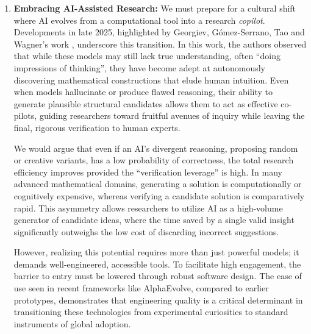 \documentclass[11pt]{article}
\numberwithin{equation}{section}
\begin{document}
\begin{enumerate}
    \item \textbf{Embracing AI-Assisted Research:} We must prepare for a cultural shift where AI evolves from a computational tool into a research \textit{copilot}. Developments in late 2025, highlighted by Georgiev, G{\'o}mez-Serrano, Tao and Wagner's work \cite{georgiev2025mathematical}, underscore this transition. In this work, the authors observed that while these models may still lack true understanding, often ``doing impressions of thinking'', they have become adept at autonomously discovering mathematical constructions that elude human intuition. Even when models hallucinate or produce flawed reasoning, their ability to generate plausible structural candidates allows them to act as effective co-pilots, guiding researchers toward fruitful avenues of inquiry while leaving the final, rigorous verification to human experts.
    
    We would argue that even if an AI's divergent reasoning, proposing random or creative variants, has a low probability of correctness, the total research efficiency improves provided the ``verification leverage'' is high. In many advanced mathematical domains, generating a solution is computationally or cognitively expensive, whereas verifying a candidate solution is comparatively rapid. This asymmetry allows researchers to utilize AI as a high-volume generator of candidate ideas, where the time saved by a single valid insight significantly outweighs the low cost of discarding incorrect suggestions.
    
    However, realizing this potential requires more than just powerful models; it demands well-engineered, accessible tools. To facilitate high engagement, the barrier to entry must be lowered through robust software design. The ease of use seen in recent frameworks like AlphaEvolve, compared to earlier prototypes, demonstrates that engineering quality is a critical determinant in transitioning these technologies from experimental curiosities to standard instruments of global adoption.
    
\end{enumerate}
\end{document}

